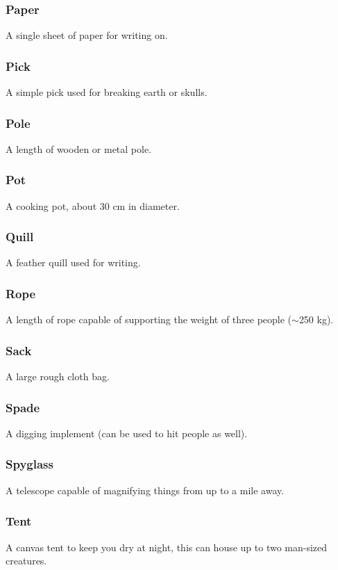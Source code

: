 \documentclass[a4paper,11pt,oneside]{book}
\begin{document}
\subsubsection*{Paper}
A single sheet of paper for writing on.

\subsubsection*{Pick}
A simple pick used for breaking earth or skulls.

\subsubsection*{Pole}
A length of wooden or metal pole.

\subsubsection*{Pot}
A cooking pot, about 30 cm in diameter.

\subsubsection*{Quill}
A feather quill used for writing.

\subsubsection*{Rope}
A length of rope capable of supporting the weight of three people ($\sim$250 kg).

\subsubsection*{Sack}
A large rough cloth bag.

\subsubsection*{Spade}
A digging implement (can be used to hit people as well).

\subsubsection*{Spyglass}
A telescope capable of magnifying things from up to a mile away.

\subsubsection*{Tent}
A canvas tent to keep you dry at night, this can house up to two man-sized creatures.
\end{document}
